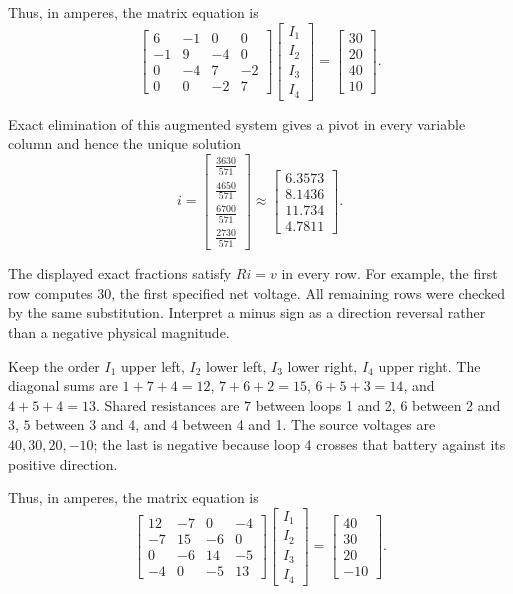 Thus, in amperes, the matrix equation is
\[ \begin{bmatrix}6 & -1 & 0 & 0\\-1 & 9 & -4 & 0\\0 & -4 & 7 & -2\\0 & 0 & -2 & 7\end{bmatrix}\begin{bmatrix}I_{1}\\I_{2}\\I_{3}\\I_{4}\end{bmatrix}=\begin{bmatrix}30\\20\\40\\10\end{bmatrix}.\]

Exact elimination of this augmented system gives a pivot in every variable column and hence the unique solution
\[ i=\begin{bmatrix}\frac{3630}{571}\\\frac{4650}{571}\\\frac{6700}{571}\\\frac{2730}{571}\end{bmatrix}\approx \begin{bmatrix}6.3573\\8.1436\\11.734\\4.7811\end{bmatrix}.\]

The displayed exact fractions satisfy $Ri=v$ in every row. For example, the first row computes $30$, the first specified net voltage. All remaining rows were checked by the same substitution. Interpret a minus sign as a direction reversal rather than a negative physical magnitude.



Keep the order $I_1$ upper left, $I_2$ lower left, $I_3$ lower right, $I_4$ upper right. The diagonal sums are $1+7+4=12$, $7+6+2=15$, $6+5+3=14$, and $4+5+4=13$. Shared resistances are $7$ between loops 1 and 2, $6$ between 2 and 3, $5$ between 3 and 4, and $4$ between 4 and 1. The source voltages are $40,30,20,-10$; the last is negative because loop 4 crosses that battery against its positive direction.

Thus, in amperes, the matrix equation is
\[ \begin{bmatrix}12 & -7 & 0 & -4\\-7 & 15 & -6 & 0\\0 & -6 & 14 & -5\\-4 & 0 & -5 & 13\end{bmatrix}\begin{bmatrix}I_{1}\\I_{2}\\I_{3}\\I_{4}\end{bmatrix}=\begin{bmatrix}40\\30\\20\\-10\end{bmatrix}.\]

